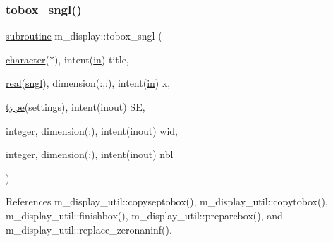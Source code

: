 \subsubsection{\texorpdfstring{tobox\+\_\+sngl()}{tobox\_sngl()}}
{\footnotesize\ttfamily \hyperlink{M__stopwatch_83_8txt_acfbcff50169d691ff02d4a123ed70482}{subroutine} m\+\_\+display\+::tobox\+\_\+sngl (\begin{DoxyParamCaption}\item[{\hyperlink{option__stopwatch_83_8txt_abd4b21fbbd175834027b5224bfe97e66}{character}($\ast$), intent(\hyperlink{M__journal_83_8txt_afce72651d1eed785a2132bee863b2f38}{in})}]{title,  }\item[{\hyperlink{read__watch_83_8txt_abdb62bde002f38ef75f810d3a905a823}{real}(\hyperlink{namespacem__display_a2ac86bc535c3ccc5947dbb3109c666b5}{sngl}), dimension(\+:,\+:), intent(\hyperlink{M__journal_83_8txt_afce72651d1eed785a2132bee863b2f38}{in})}]{x,  }\item[{\hyperlink{stop__watch_83_8txt_a70f0ead91c32e25323c03265aa302c1c}{type}(settings), intent(inout)}]{SE,  }\item[{integer, dimension(\+:), intent(inout)}]{wid,  }\item[{integer, dimension(\+:), intent(inout)}]{nbl }\end{DoxyParamCaption})\hspace{0.3cm}{\ttfamily [private]}}



References m\+\_\+display\+\_\+util\+::copyseptobox(), m\+\_\+display\+\_\+util\+::copytobox(), m\+\_\+display\+\_\+util\+::finishbox(), m\+\_\+display\+\_\+util\+::preparebox(), and m\+\_\+display\+\_\+util\+::replace\+\_\+zeronaninf().

